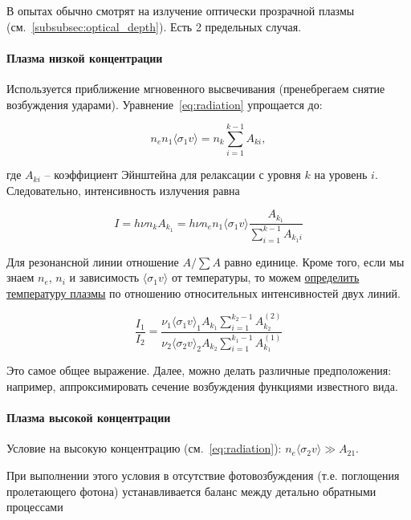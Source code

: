 \documentclass[10pt, a4paper]{article}
\begin{document}
В опытах обычно смотрят на излучение оптически прозрачной плазмы (см.~\ref{subsubsec:optical_depth}). Есть 2 предельных случая.

\paragraph{Плазма низкой концентрации}

Используется приближение мгновенного высвечивания (пренебрегаем снятие возбуждения ударами). Уравнение~\eqref{eq:radiation} упрощается до:

\begin{equation*}
	n_e n_1 \langle\sigma_1 v\rangle = n_k \sum\limits_{i=1}^{k-1}A_{k i},
\end{equation*}

где $A_{k i}$ -- коэффициент Эйнштейна для релаксации с уровня $k$ на уровень $i$.
Следовательно, интенсивность излучения равна

\begin{equation*}
	I=h \nu n_k A_{k_1}=h \nu n_e n_1 \langle\sigma_1 v\rangle\frac{A_{k_1}}{\sum\limits_{i=1}^{k-1} A_{k_1i}}
\end{equation*}

Для резонансной линии отношение $A/\sum A$ равно единице. Кроме того, если мы знаем $n_e$, $n_i$ и зависимость $\langle\sigma_1 v\rangle$ от температуры, то можем \uline{определить температуру плазмы} по отношению относительных интенсивностей двух линий.

\begin{equation*}
	\frac{I_1}{I_2}= \frac {\nu_1 \langle\sigma_1 v\rangle_1 A_{k_1} \sum\limits_{i=1}^{k_2-1} A_{k_2}^{(2)} }{\nu_2 \langle\sigma_2 v\rangle_2 A_{k_2} \sum\limits_{i=1}^{k_1-1} A_{k_1}^{(1)}}
\end{equation*}

Это самое общее выражение. Далее, можно делать различные предположения: например, аппроксимировать сечение возбуждения функциями известного вида.

\paragraph{Плазма высокой концентрации}

Условие на высокую концентрацию (см.~\eqref{eq:radiation}): $n_e \langle\sigma_2 v\rangle \gg A_{21}$.

При выполнении этого условия в отсутствие фотовозбуждения (т.е. поглощения пролетающего фотона) устанавливается баланс между детально обратными процессами 
\end{document}
